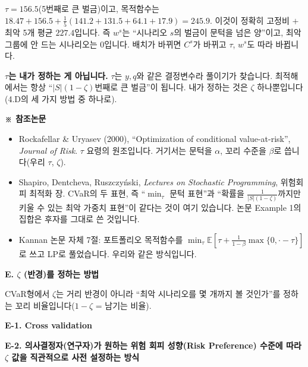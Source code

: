 \documentclass[10pt,a4paper]{article}
\newcommand{\hd}[1]{\par\vspace{8pt}\textbf{#1}\par\vspace{3pt}}
\begin{document}
$\tau=156.5$(5번째로 큰 벌금)이고, 목적함수는
$18.47+156.5+\frac15(141.2+131.5+64.1+17.9)=245.9$.
이것이 정확히 고정비 $+$ 최악 5개 평균 $227.4$입니다. 즉 $w^{s}$는 ``시나리오 $s$의 벌금이 문턱을
넘은 양''이고, 최악 그룹에 안 드는 시나리오는 0입니다. 배치가 바뀌면 $C^{s}$가 바뀌고 $\tau$, $w^{s}$도
따라 바뀝니다.

\textbf{$\tau$는 내가 정하는 게 아닙니다.}
$\tau$는 $y,q$와 같은 결정변수라 풀이기가 찾습니다. 최적해에서는 항상 ``$|S|(1-\zeta)$번째로 큰 벌금''이 됩니다. 내가 정하는 것은 $\zeta$ 하나뿐입니다(4.D의 세 가지 방법 중 하나로).

\textbf{※ 참조논문}
\begin{itemize}[leftmargin=1.5em]
\item Rockafellar \& Uryasev (2000), ``Optimization of conditional value-at-risk'', \textit{Journal of Risk}. $\tau$ 요령의 원조입니다. 거기서는 문턱을 $\alpha$, 꼬리 수준을 $\beta$로 씁니다(우리 $\tau$, $\zeta$).
\item Shapiro, Dentcheva, Ruszczyński, \textit{Lectures on Stochastic Programming}, 위험회피 최적화 장. CVaR의 두 표현, 즉 ``$\min_\tau$ 문턱 표현''과 ``확률을 $\frac1{|S|(1-\zeta)}$까지만 키울 수 있는 최악 가중치 표현''이 같다는 것이 여기 있습니다. 논문 Example 1의 집합은 후자를 그대로 쓴 것입니다.
\item Kannan 논문 자체 7절: 포트폴리오 목적함수를 $\min_\tau\mathbb E[\tau+\frac1{1-\beta}\max\{0,\cdot-\tau\}]$로 쓰고 LP로 풀었습니다. 우리와 같은 방식입니다.
\end{itemize}

\newpage
\hd{E. $\zeta$ (반경)를 정하는 방법}

CVaR형에서 $\zeta$는 거리 반경이 아니라 ``최악 시나리오를 몇 개까지 볼 것인가''를 정하는 꼬리 비율입니다($1-\zeta$ = 남기는 비율).

\hd{\textbf{E-1. Cross validation}}
\hd{\textbf{E-2. 의사결정자(연구자)가 원하는 위험 회피 성향(Risk Preference) 수준에 따라 $\zeta$ 값을 직관적으로 사전 설정하는 방식}}
\end{document}
